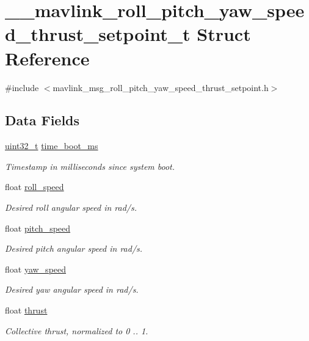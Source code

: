 \hypertarget{struct____mavlink__roll__pitch__yaw__speed__thrust__setpoint__t}{\section{\-\_\-\-\_\-mavlink\-\_\-roll\-\_\-pitch\-\_\-yaw\-\_\-speed\-\_\-thrust\-\_\-setpoint\-\_\-t Struct Reference}
\label{struct____mavlink__roll__pitch__yaw__speed__thrust__setpoint__t}
}


{\ttfamily \#include $<$mavlink\-\_\-msg\-\_\-roll\-\_\-pitch\-\_\-yaw\-\_\-speed\-\_\-thrust\-\_\-setpoint.\-h$>$}

\subsection*{Data Fields}
\begin{DoxyCompactItemize}
\item 
\hyperlink{stdint_8h_a435d1572bf3f880d55459d9805097f62}{uint32\-\_\-t} \hyperlink{struct____mavlink__roll__pitch__yaw__speed__thrust__setpoint__t_a23cbdd8f2f256cee699824cb374c5efa}{time\-\_\-boot\-\_\-ms}
\begin{DoxyCompactList}\small\item\em Timestamp in milliseconds since system boot. \end{DoxyCompactList}\item 
float \hyperlink{struct____mavlink__roll__pitch__yaw__speed__thrust__setpoint__t_a643f9a210dda52b34891163c9463185e}{roll\-\_\-speed}
\begin{DoxyCompactList}\small\item\em Desired roll angular speed in rad/s. \end{DoxyCompactList}\item 
float \hyperlink{struct____mavlink__roll__pitch__yaw__speed__thrust__setpoint__t_a5046534fc2b083023a74d5f4aaf36e33}{pitch\-\_\-speed}
\begin{DoxyCompactList}\small\item\em Desired pitch angular speed in rad/s. \end{DoxyCompactList}\item 
float \hyperlink{struct____mavlink__roll__pitch__yaw__speed__thrust__setpoint__t_a7656a62ad9ee1291a5917486d5610633}{yaw\-\_\-speed}
\begin{DoxyCompactList}\small\item\em Desired yaw angular speed in rad/s. \end{DoxyCompactList}\item 
float \hyperlink{struct____mavlink__roll__pitch__yaw__speed__thrust__setpoint__t_ab28bd5d6a16896a4358b8f182d2b6a17}{thrust}
\begin{DoxyCompactList}\small\item\em Collective thrust, normalized to 0 .. 1. \end{DoxyCompactList}\end{DoxyCompactItemize}



